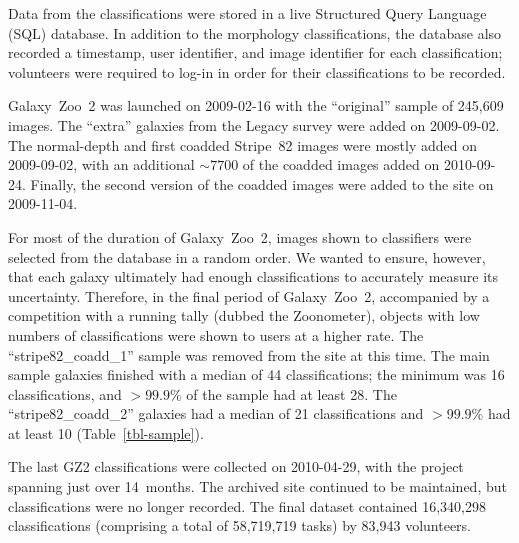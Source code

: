 \documentclass[useAMS,usenatbib]{mn2e}
\begin{document}
Data from the classifications were stored in a live Structured Query Language (SQL) database. In addition to the morphology classifications, the database also recorded a timestamp, user identifier, and image identifier for each classification; volunteers were required to log-in in order for their classifications to be recorded. 

Galaxy~Zoo~2 was launched on 2009-02-16 with the ``original'' sample of 245,609 images. The ``extra'' galaxies from the Legacy survey were added on 2009-09-02. The normal-depth and first coadded Stripe~82 images were mostly added on 2009-09-02, with an additional $\sim7700$ of the coadded images added on 2010-09-24. Finally, the second version of the coadded images were added to the site on 2009-11-04. 

For most of the duration of Galaxy~Zoo~2, images shown to classifiers were selected from the database in a random order. We wanted to ensure, however, that each galaxy ultimately had enough classifications to accurately measure its uncertainty. Therefore, in the final period of Galaxy~Zoo~2, accompanied by a competition with a running tally (dubbed the Zoonometer), objects with low numbers of classifications were shown to users at a higher rate. The ``stripe82\_coadd\_1'' sample was removed from the site at this time. The main sample galaxies finished with a median of 44 classifications; the minimum was 16 classifications, and $>99.9\%$ of the sample had at least 28. The ``stripe82\_coadd\_2'' galaxies had a median of 21 classifications and $>99.9\%$ had at least 10 (Table~\ref{tbl-sample}).

The last GZ2 classifications were collected on 2010-04-29, with the project spanning just over 14~months. The archived site continued to be maintained, but classifications were no longer recorded. The final dataset contained 16,340,298 classifications (comprising a total of 58,719,719 tasks) by 83,943 volunteers.
\end{document}
